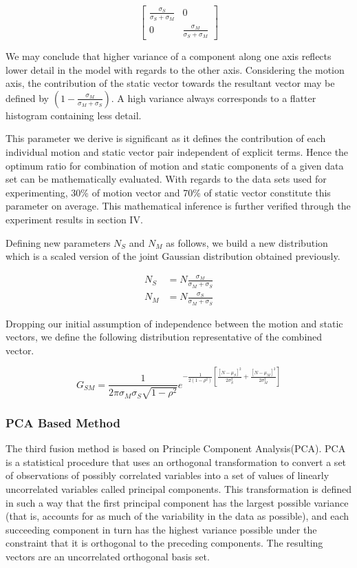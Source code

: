 \[
\begin{bmatrix}
    \frac {\sigma_S}{\sigma_S + \sigma_M} & 0  \\
    0 & \frac {\sigma_M}{\sigma_S + \sigma_M}
\end{bmatrix}
\]

We may conclude that higher variance of a component along one axis reflects lower detail in the model with regards to the other axis. Considering the motion axis, the contribution of the static vector towards the resultant vector may be defined by $(1-\frac{\sigma_M}{\sigma_M+\sigma_S})$. A high variance always corresponds to a flatter histogram containing less detail.

This parameter we derive is significant as it defines the contribution of each individual motion and static vector pair independent of explicit terms. Hence the optimum ratio for combination of motion and static components of a given data set can be mathematically evaluated. With regards to the data sets used for experimenting, 30\% of motion
vector and 70\% of static vector constitute this parameter on average. This mathematical inference is further verified through the experiment results in section IV.

Defining new parameters $N_S$ and $N_M$ as follows, we build a new distribution which is a scaled version of the joint Gaussian distribution obtained previously.

\begin{align*}
N_S &= N \frac{\sigma_M}{\sigma_M+\sigma_S}  \\
N_M &= N \frac{\sigma_S}{\sigma_M+\sigma_S}
\end{align*}

Dropping our initial assumption of independence between the motion and static vectors, we define the following distribution representative of the combined vector.

\begin{equation}
G_{SM}= \frac{1}{2\pi\sigma_M\sigma_S\sqrt{1-\rho^2}} e^{-\frac{1}{2(1-\rho^2)}\left[\frac{[N-\mu_S]^2}{2\sigma_S^2}+ \frac{[N-\mu_M]^2}{2\sigma_M^2} \right]}
\end{equation}

\subsubsection{PCA Based Method}



The third fusion method is based on Principle Component Analysis(PCA). PCA is a statistical procedure that uses an orthogonal transformation to convert a
set of observations of possibly correlated variables into a set of values of linearly uncorrelated
variables called principal components. This transformation is defined in such a way that the first
principal component has the largest possible variance (that is, accounts for as much of the
variability in the data as possible), and each succeeding component in turn has the highest
variance possible under the constraint that it is orthogonal to the preceding components. The
resulting vectors are an uncorrelated orthogonal basis set.


